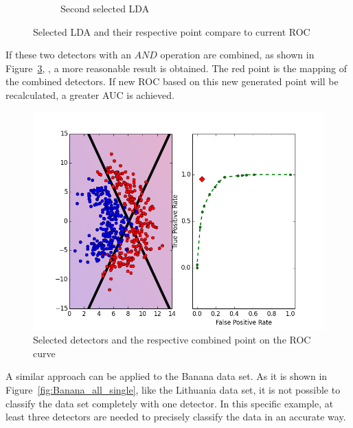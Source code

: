 \begin{figure}[H]
\begin{adjustbox}{minipage=\linewidth,scale=1.1}
\begin{subfigure}[b]{0.5\columnwidth}
        \caption{Second selected LDA}
        \label{fig:Dataset_ROC_Lithuanian_b}
    \end{subfigure}
    \caption{Selected LDA and their respective point compare to current ROC}
    \label{fig:Dataset_ROC_Lithuanian}
    \end{adjustbox}
\end{figure}

If these two detectors with an $AND$ operation are combined,  as shown in Figure~\ref{fig::combined_lithuanian_roc},  , a more reasonable result is obtained. The red point is the mapping of the combined detectors. If new ROC based on this new generated point will be recalculated, a greater AUC is achieved. 

\begin{figure}[H]
\centering
\includegraphics[scale=0.6]{figs/Lithuanian/9999999-combined_All-Classifiers}
\caption{Selected detectors and the respective combined point on the ROC curve}
\label{fig::combined_lithuanian_roc}
\end{figure}


A similar approach can be applied to the Banana data set. As it is shown in Figure~\ref{fig:Banana_all_single}, like the Lithuania data set, it is not possible to classify the data set completely with one detector.  In this specific example, at least three detectors are needed to precisely classify the data in an accurate way. 

